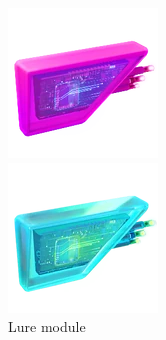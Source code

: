 \begin{figure}[h!]
  \begin{minipage}[t]{0.3\textwidth}
    \begin{center}
    \includegraphics[width=\textwidth]{images/lure.png}
    \end{center}
    \caption*{Lure module}
    \label{fig:lure}
  \end{minipage}
  \begin{minipage}[t]{0.3\textwidth}
    \begin{center}
    \includegraphics[width=\textwidth]{images/rainylure.png}

\end{center}
\end{minipage}
\end{figure}
